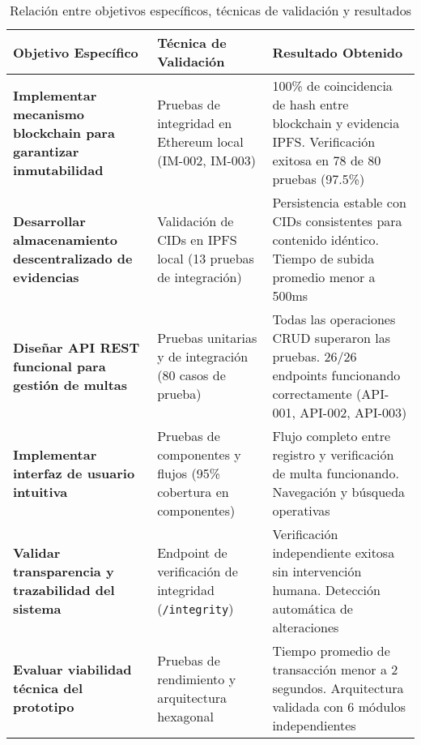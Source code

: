 \begin{table}[htbp]
\centering
\caption{Relación entre objetivos específicos, técnicas de validación y resultados}
\label{tab:cumplimiento_objetivos}
\begin{adjustbox}{max width=\textwidth}
\begin{tabular}{@{}p{4.5cm}p{4cm}p{6cm}@{}}
\toprule
\textbf{Objetivo Específico} & \textbf{Técnica de Validación} & \textbf{Resultado Obtenido} \\
\midrule

\textbf{Implementar mecanismo blockchain para garantizar inmutabilidad} &
Pruebas de integridad en Ethereum local (IM-002, IM-003) &
100\% de coincidencia de hash entre blockchain y evidencia IPFS. Verificación exitosa en 78 de 80 pruebas (97.5\%) \\
\addlinespace

\textbf{Desarrollar almacenamiento descentralizado de evidencias} &
Validación de CIDs en IPFS local (13 pruebas de integración) &
Persistencia estable con CIDs consistentes para contenido idéntico. Tiempo de subida promedio menor a 500ms \\
\addlinespace

\textbf{Diseñar API REST funcional para gestión de multas} &
Pruebas unitarias y de integración (80 casos de prueba) &
Todas las operaciones CRUD superaron las pruebas. 26/26 endpoints funcionando correctamente (API-001, API-002, API-003) \\
\addlinespace

\textbf{Implementar interfaz de usuario intuitiva} &
Pruebas de componentes y flujos (95\% cobertura en componentes) &
Flujo completo entre registro y verificación de multa funcionando. Navegación y búsqueda operativas \\
\addlinespace

\textbf{Validar transparencia y trazabilidad del sistema} &
Endpoint de verificación de integridad (\texttt{/integrity}) &
Verificación independiente exitosa sin intervención humana. Detección automática de alteraciones \\
\addlinespace

\textbf{Evaluar viabilidad técnica del prototipo} &
Pruebas de rendimiento y arquitectura hexagonal &
Tiempo promedio de transacción menor a 2 segundos. Arquitectura validada con 6 módulos independientes \\

\bottomrule
\end{tabular}
\end{adjustbox}
\end{table}
